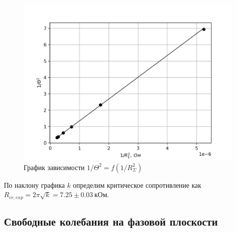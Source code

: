 \documentclass[14pt, a4paper]{report}
\begin{document}
\begin{enumerate}
\begin{figure}[H]
\centering
\includegraphics[scale=0.6]{images/325_1.png}
\caption{График зависимости $1/\Theta^2=f(1/R_{\Sigma}^2)$}
\end{figure}

По наклону графика $k$ определим критическое сопротивление как $R_{cr, exp}=2\pi\sqrt{k}=7.25\pm0.03\ кОм$.

\end{enumerate}

\subsection{Свободные колебания на фазовой плоскости}
\end{document}
